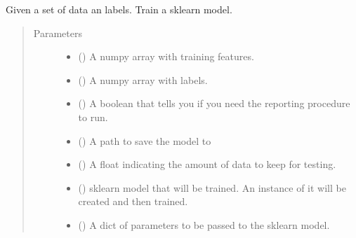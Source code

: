 \documentclass[letterpaper,10pt,english]{sphinxmanual}
\begin{document}
\begin{fulllineitems}
\label{\detokenize{api:readpyne.model.train_model}}
Given a set of data an labels. Train a sklearn model.
\begin{quote}\begin{description}
\item[{Parameters}] \leavevmode\begin{itemize}
\item {} 
 () \textendash{} A numpy array with training features.

\item {} 
 () \textendash{} A numpy array with labels.

\item {} 
 () \textendash{} A boolean that tells you if you need the reporting procedure to run.

\item {} 
 () \textendash{} A path to save the model to

\item {} 
 () \textendash{} A float indicating the amount of data to keep for testing.

\item {} 
 () \textendash{} sklearn model that will be trained. An instance of it will be created and then
trained.

\item {} 
 () \textendash{} A dict of parameters to be passed to the sklearn model.


\end{itemize}
\end{description}
\end{quote}
\end{fulllineitems}
\end{document}
